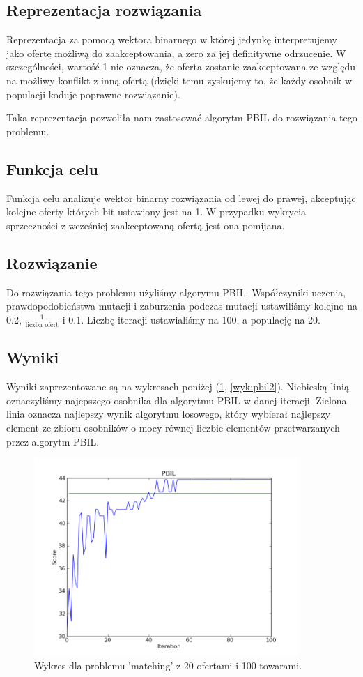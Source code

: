 \subsection{Reprezentacja rozwiązania}

Reprezentacja za pomocą wektora binarnego w której jedynkę interpretujemy jako ofertę możliwą do zaakceptowania, a zero za jej definitywne odrzucenie. W szczególności, wartość 1 nie oznacza, że oferta zostanie zaakceptowana ze względu na możliwy konflikt z inną ofertą (dzięki temu zyskujemy to, że każdy osobnik w populacji koduje poprawne rozwiązanie).

Taka reprezentacja pozwoliła nam zastosować algorytm PBIL do rozwiązania tego problemu.

\subsection{Funkcja celu}
Funkcja celu analizuje wektor binarny rozwiązania od lewej do prawej, akceptując kolejne oferty których bit ustawiony jest na 1. W przypadku wykrycia sprzeczności z wcześniej zaakceptowaną ofertą jest ona pomijana.

\subsection{Rozwiązanie}
Do rozwiązania tego problemu użyliśmy algorymu PBIL.
Współczyniki uczenia, prawdopodobieństwa mutacji i zaburzenia podczas mutacji ustawiliśmy kolejno na 0.2, $\frac{1}{\text{liczba ofert}}$ i 0.1.
Liczbę iteracji ustawialiśmy na 100, a populację na 20.

\subsection{Wyniki}
Wyniki zaprezentowane są na wykresach poniżej (\ref{wyk:pbil1}, \ref{wyk:pbil2}).
Niebieską linią oznaczyliśmy najepszego osobnika dla algorytmu PBIL w danej iteracji. Zielona linia oznacza najlepszy wynik algorytmu losowego, który wybierał najlepszy element ze zbioru osobników o mocy równej liczbie elementów przetwarzanych przez algorytm PBIL.
\begin{figure}[!ht]
    \centering
    \includegraphics[width=10cm]{wykresy/matching_bids_100_goods_20_0000_txt_pbil.png}
    \caption{Wykres dla problemu 'matching' z 20 ofertami i 100 towarami.}
    \label{wyk:pbil1}
\end{figure}

